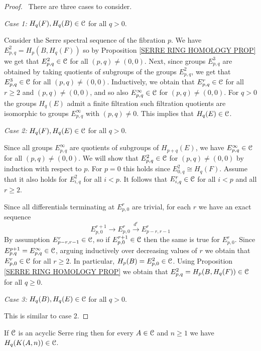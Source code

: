 \begin{proof}\ 
There are three cases to consider. 

\emph{Case 1:} $H_{q}(F), H_{q}(B) \in {\mathcal C}$ for all $q > 0$.

Consider the Serre spectral sequence of the fibration $p$. 
We have $E^{2}_{p, q} = H_{p}(B, H_{q}(F))$ so by 
Proposition \ref{SERRE RING HOMOLOGY PROP} we get that $E^{2}_{p, q} \in {\mathcal C}$
for all $(p, q) \neq (0, 0)$. Next, since groups $E^{3}_{p, q}$ are obtained 
by taking quotients of subgroups of the groups $E^{2}_{p, q}$, we get that 
$E^{3}_{p, q}\in {\mathcal C}$ for all $(p, q) \neq (0, 0)$. Inductively, we obtain 
that $E^{r}_{p, q}\in {\mathcal C}$ for all $r \geq 2$ and $(p, q)\neq (0, 0)$, 
and so also $E^{\infty}_{p, q}\in {\mathcal C}$ for $(p, q)\neq (0, 0)$. 
For $q > 0$ the groups $H_{q}(E)$ admit a finite filtration such filtration
quotients are isomorphic to groups $E^{\infty}_{p, q}$ with $(p, q)\neq 0$. 
This implies that $H_{q}(E)\in {\mathcal C}$.

\emph{Case 2:} $H_{q}(F), H_{q}(E) \in {\mathcal C}$ for all $q > 0$.

Since all groups $E^{\infty}_{p, q}$ are quotients of subgroups of $H_{p+q}(E)$, 
we have $E^{\infty}_{p, q}\in {\mathcal C}$ for all $(p, q) \neq (0, 0)$. 
We will show that $E^2_{p, q}\in {\mathcal C}$ for $(p, q)\neq (0, 0)$ by induction with 
respect to $p$. For $p=0$ this holds since $E^{2}_{0, q}\cong H_{q}(F)$. 
Assume that it also holds for $E^{2}_{i, q}$ for all $i < p$. It follows that 
$E^{r}_{i, q}\in {\mathcal C}$ for all $i < p$ and all $r\geq 2$. 

Since all differentials 
terminating at $E^{r}_{p, 0}$ are trivial, for each $r$ we have an exact 
sequence 
\[
E^{r+1}_{p, 0} \to E^{r}_{p, 0} \overset{d^{r}}{\to} E^{r}_{p-r, r-1}
\]
By assumption $E^{r}_{p-r, r-1}\in {\mathcal C}$, so if $E^{r+1}_{p, 0} \in {\mathcal C}$
then the same is true for $E^{r}_{p, 0}$. Since 
$E^{p+1}_{p, q} = E^{\infty}_{p, q} \in {\mathcal C}$, arguing inductively over 
decreasing values of $r$ we obtain that $E^{r}_{p, 0} \in{\mathcal C}$ for all $r\geq 2$. 
In particular, $H_{p}(B) = E^{2}_{p, 0}\in {\mathcal C}$. Using Proposition 
\ref{SERRE RING HOMOLOGY PROP} we obtain that $E^2_{p, q} = H_{p}(B, H_{q}(F))\in {\mathcal C}$
for all $q\geq 0$. 

\emph{Case 3:} $H_{q}(B), H_{q}(E) \in {\mathcal C}$ for all $q > 0$.

This is similar to case 2.
\end{proof}


\begin{proposition}
\label{HOMOLOGY K(GN) ACYCLIC SERRE CLASS PROP}
If ${\mathcal C}$ is an acyclic Serre ring then for every $A\in {\mathcal C}$ and $n\geq 1$
we have $H_{q}(K(A, n)) \in {\mathcal C}$. 
\end{proposition}

